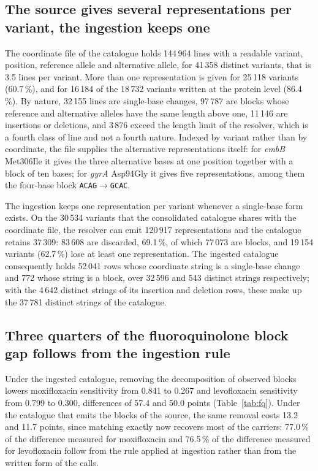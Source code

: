 \documentclass[11pt]{article}
\begin{document}
\subsection{The source gives several representations per variant, the ingestion keeps one}
The coordinate file of the catalogue holds 144\,964 lines with a readable variant,
position, reference allele and alternative allele, for 41\,358 distinct variants, that is
3.5 lines per variant. More than one representation is given for 25\,118 variants
(60.7\,\%), and for 16\,184 of the 18\,732 variants written at the protein level
(86.4\,\%). By nature, 32\,155 lines are single-base changes, 97\,787 are blocks whose
reference and alternative alleles have the same length above one, 11\,146 are insertions
or deletions, and 3\,876 exceed the length limit of the resolver, which is a fourth class of
line and not a fourth nature. Indexed by variant rather than by coordinate, the file supplies
the alternative representations itself: for \textit{embB} Met306Ile it gives the three
alternative bases at one position together with a block of ten bases; for \textit{gyrA}
Asp94Gly it gives five representations, among them the four-base block
\texttt{ACAG}$\rightarrow$\texttt{GCAC}.

The ingestion keeps one representation per variant whenever a single-base form exists. On
the 30\,534 variants that the consolidated catalogue shares with the coordinate file, the
resolver can emit 120\,917 representations and the catalogue retains 37\,309: 83\,608 are
discarded, 69.1\,\%, of which 77\,073 are blocks, and 19\,154 variants (62.7\,\%) lose at
least one representation. The ingested catalogue consequently holds 52\,041 rows whose
coordinate string is a single-base change and 772 whose string is a block, over 32\,596 and
543 distinct strings respectively; with the 4\,642 distinct strings of its insertion and
deletion rows, these make up the 37\,781 distinct strings of the catalogue.

\subsection{Three quarters of the fluoroquinolone block gap follows from the ingestion rule}
Under the ingested catalogue,
removing the decomposition of observed blocks lowers moxifloxacin sensitivity from 0.841 to
0.267 and levofloxacin sensitivity from 0.799 to 0.300, differences of 57.4 and 50.0
points (Table~\ref{tab:fq}). Under the catalogue that emits the blocks of the source, the same removal costs
13.2 and 11.7 points, since matching exactly now recovers most of the carriers: 77.0\,\% of
the difference measured for moxifloxacin and 76.5\,\% of the difference measured for
levofloxacin follow from the rule applied at ingestion rather than from the written form of
the calls.
\end{document}
